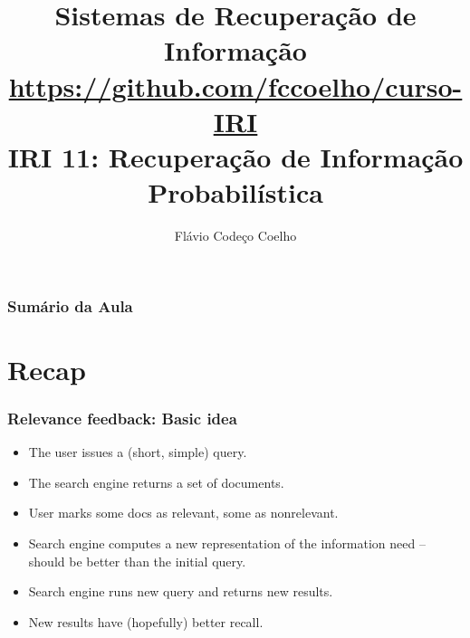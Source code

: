 \documentclass[compress]{beamer}
\title[Recuperação Probabilística\hspace{2em}\insertframenumber/\inserttotalframenumber]
{Sistemas de Recuperação de Informação\\
\large \url{https://github.com/fccoelho/curso-IRI}\\[0.5cm]
IRI 11: Recuperação de Informação Probabilística}
\author [Coelho F.C. \& Souza R.R.]{ Flávio Codeço Coelho}
\institute [EMAp, FGV]{Escola de Matemática Aplicada,   Fundação Getúlio Vargas}
\date
\begin{document}
\begin{frame}
\titlepage
\end{frame}

\begin{frame}[fragile]
\frametitle{Sumário da Aula}
\tableofcontents
\end{frame}

\section{Recap}

\begin{frame}
\frametitle{Relevance feedback: Basic idea}

\begin{itemize}
\item The user  issues a (short, simple) query.
\item The search engine returns a set of documents.
\item User marks some docs as relevant, some as nonrelevant.
\item Search engine computes a new representation of
  the information need -- should be better than the initial query.
\item Search engine runs new query and returns new
 results.
\item New results have (hopefully) better recall.
\end{itemize}
\end{frame}
\end{document}
